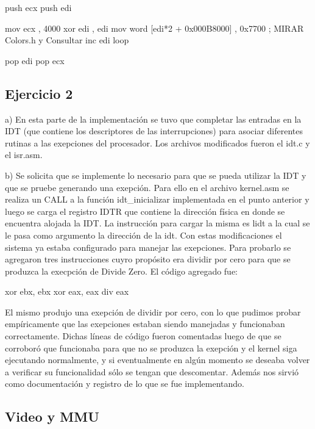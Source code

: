 \documentclass[a4paper]{article}
\begin{document}

    push ecx
    push edi

    mov ecx , 4000
    xor edi , edi
        mov word [edi*2 + 0x000B8000] , 0x7700  ; MIRAR Colors.h y Consultar
        inc edi
        loop %

    pop edi
    pop ecx


\subsection{Ejercicio 2}

a) En esta parte de la implementación se tuvo que completar las entradas en la IDT (que contiene los descriptores de las interrupciones) para asociar diferentes rutinas a las exepciones del procesador. Los archivos modificados fueron el idt.c y el isr.asm. 

b) Se solicita que se implemente lo necesario para que se pueda utilizar la IDT y que se pruebe generando una exepción. Para ello en el archivo kernel.asm se realiza un CALL a la función idt_inicializar implementada en el punto anterior y luego se carga el registro IDTR que contiene la dirección física en donde se encuentra alojada la IDT. La instrucción para cargar la misma es lidt a la cual se le pasa como argumento la dirección de la idt. Con estas modificaciones el sistema ya estaba configurado para manejar las exepciones. Para probarlo se agregaron tres instrucciones cuyro propósito era dividir por cero para que se produzca la execpción de Divide Zero. El código agregado fue:

xor ebx, ebx
xor eax, eax
div eax

El mismo produjo una exepción de dividir por cero, con lo que pudimos probar empíricamente que las exepciones estaban siendo manejadas y funcionaban correctamente. Dichas líneas de código fueron comentadas luego de que se corroboró que funcionaba para que no se produzca la exepción y el kernel siga ejecutando normalmente, y si eventualmente en algún momento se deseaba volver a verificar su funcionalidad sólo se tengan que descomentar. Además nos sirvió como documentación y registro de lo que se fue implementando. 



\subsection{Video y MMU}
\end{document}
